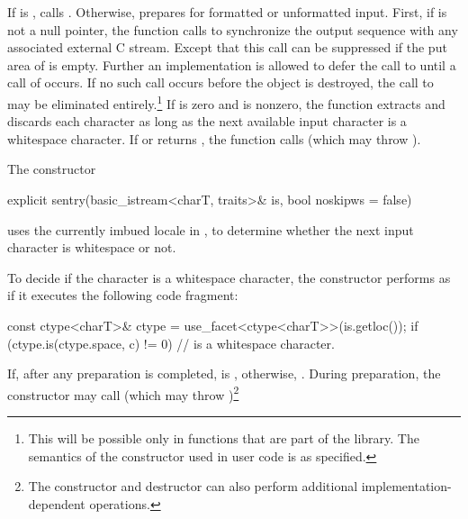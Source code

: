 \begin{itemdescr}
\pnum
\effects
If
is
,
calls . Otherwise,
prepares for formatted or
unformatted input.
First, if
is not a null pointer, the
function calls
%
to synchronize the output sequence with any associated external
C stream.
Except that this call can be suppressed if the put area of
is empty.
Further an implementation is allowed to defer the call to
until a
call of
occurs.
If no such call occurs before the
object is destroyed, the call to
may be eliminated entirely.\footnote{This will be possible only in functions
that are part of the library.
The semantics of the constructor used in user code is as specified.}
If  is zero and
is nonzero, the function extracts and discards each character as long as
the next available input character  is a whitespace character.
If
or
returns
,
the function calls
(which may throw
).

\pnum
\remarks
The constructor
\begin{codeblock}
explicit sentry(basic_istream<charT, traits>& is, bool noskipws = false)
\end{codeblock}
uses the currently imbued locale in ,
to determine whether the next input character is
whitespace or not.

\pnum
To decide if the character  is a whitespace character,
the constructor performs as if it executes the following code fragment:
\begin{codeblock}
const ctype<charT>& ctype = use_facet<ctype<charT>>(is.getloc());
if (ctype.is(ctype.space, c) != 0)
  //  is a whitespace character.
\end{codeblock}

\pnum
If, after any preparation is completed,
is
,
otherwise,
.
During preparation, the constructor may call
(which may throw
)\footnote{The
constructor and destructor
can also perform additional
%
implementation-dependent operations.}
\end{itemdescr}

